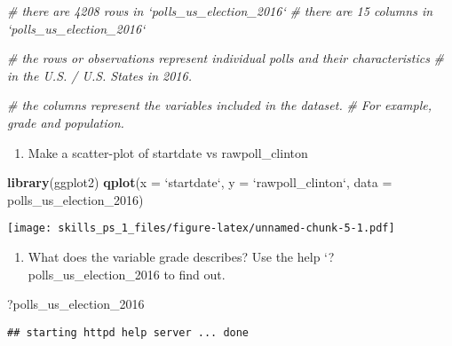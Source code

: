 \documentclass[
]{article}
\newenvironment{Shaded}{\begin{snugshade}}{\end{snugshade}}
\newcommand{\CommentTok}[1]{\textcolor[rgb]{0.56,0.35,0.01}{\textit{#1}}}
\newcommand{\DataTypeTok}[1]{\textcolor[rgb]{0.13,0.29,0.53}{#1}}
\newcommand{\DecValTok}[1]{\textcolor[rgb]{0.00,0.00,0.81}{#1}}
\newcommand{\KeywordTok}[1]{\textcolor[rgb]{0.13,0.29,0.53}{\textbf{#1}}}
\newcommand{\NormalTok}[1]{#1}
\newcommand{\StringTok}[1]{\textcolor[rgb]{0.31,0.60,0.02}{#1}}
\providecommand{\tightlist}{%
  \setlength{\itemsep}{0pt}\setlength{\parskip}{0pt}}
\begin{document}
\begin{Shaded}
\begin{Highlighting}[]
\CommentTok{# there are 4208 rows in `polls_us_election_2016`}
\CommentTok{# there are 15 columns in `polls_us_election_2016`}
 
\CommentTok{# the rows or observations represent individual polls and their characteristics }
\CommentTok{# in the U.S. / U.S. States in 2016.}

\CommentTok{# the columns represent the variables included in the dataset. }
\CommentTok{# For example, grade and population.}
\end{Highlighting}
\end{Shaded}

\begin{enumerate}
\def\labelenumi{\arabic{enumi}.}
\tightlist
\item
  Make a scatter-plot of startdate vs rawpoll\_clinton
\end{enumerate}

\begin{Shaded}
\begin{Highlighting}[]
\KeywordTok{library}\NormalTok{(ggplot2)}
\KeywordTok{qplot}\NormalTok{(}\DataTypeTok{x =} \StringTok{`}\DataTypeTok{startdate}\StringTok{`}\NormalTok{, }\DataTypeTok{y =} \StringTok{`}\DataTypeTok{rawpoll_clinton}\StringTok{`}\NormalTok{, }\DataTypeTok{data =}\NormalTok{ polls_us_election_}\DecValTok{2016}\NormalTok{)}
\end{Highlighting}
\end{Shaded}

\texttt{[image: skills\_ps\_1\_files/figure-latex/unnamed-chunk-5-1.pdf]}

\begin{enumerate}
\def\labelenumi{\arabic{enumi}.}
\tightlist
\item
  What does the variable grade describes? Use the help
  `?polls\_us\_election\_2016 to find out.
\end{enumerate}

\begin{Shaded}
\begin{Highlighting}[]
\NormalTok{?polls_us_election_}\DecValTok{2016}
\end{Highlighting}
\end{Shaded}

\begin{verbatim}
## starting httpd help server ... done
\end{verbatim}
\end{document}
